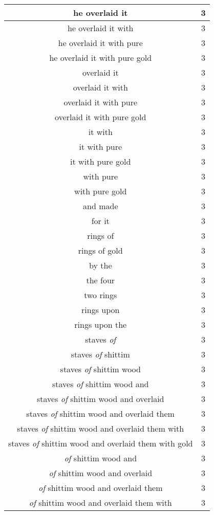 \begin{center}
\begin{longtable}{|c|c|}
he overlaid it & 3\\ \hline 
he overlaid it with & 3\\ \hline 
he overlaid it with pure & 3\\ \hline 
he overlaid it with pure gold & 3\\ \hline 
overlaid it & 3\\ \hline 
overlaid it with & 3\\ \hline 
overlaid it with pure & 3\\ \hline 
overlaid it with pure gold & 3\\ \hline 
it with & 3\\ \hline 
it with pure & 3\\ \hline 
it with pure gold & 3\\ \hline 
with pure & 3\\ \hline 
with pure gold & 3\\ \hline 
and made & 3\\ \hline 
for it & 3\\ \hline 
rings of & 3\\ \hline 
rings of gold & 3\\ \hline 
by the & 3\\ \hline 
the four & 3\\ \hline 
two rings & 3\\ \hline 
rings upon & 3\\ \hline 
rings upon the & 3\\ \hline 
staves \emph{of} & 3\\ \hline 
staves \emph{of} shittim & 3\\ \hline 
staves \emph{of} shittim wood & 3\\ \hline 
staves \emph{of} shittim wood and & 3\\ \hline 
staves \emph{of} shittim wood and overlaid & 3\\ \hline 
staves \emph{of} shittim wood and overlaid them & 3\\ \hline 
staves \emph{of} shittim wood and overlaid them with & 3\\ \hline 
staves \emph{of} shittim wood and overlaid them with gold & 3\\ \hline 
\emph{of} shittim wood and & 3\\ \hline 
\emph{of} shittim wood and overlaid & 3\\ \hline 
\emph{of} shittim wood and overlaid them & 3\\ \hline 
\emph{of} shittim wood and overlaid them with & 3\\ \hline 

\end{longtable}
\end{center}
